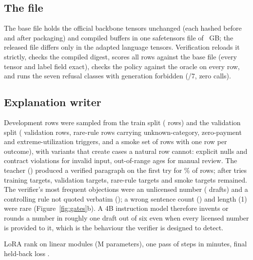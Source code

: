 \documentclass[twocolumn,10pt]{article}
\begin{document}
\subsection{The file}

The base file holds the \nOfficialTensors{} official backbone tensors unchanged (each hashed before and after packaging)
and \nCompiledTensors{} compiled buffers in one safetensors file of \nWeightGB{}~GB; the released file differs only in the
adapted language tensors. Verification reloads it strictly, checks the compiled digest, scores all \nParityRows{} rows
against the base file (every tensor and label field exact), checks the policy against the oracle on every row, and runs
the seven refusal classes with generation forbidden (\nRefusalClasses{}/7, zero calls).

\subsection{Explanation writer}

Development rows were sampled from the train split (\nRowsTrain{} rows) and the validation split (\nRowsValidation{}
validation rows, \nRowsRare{} rare-rule rows carrying unknown-category, zero-payment and extreme-utilization triggers,
and a smoke set of \nRowsSmoke{} rows with one row per outcome), with variants that create cases a natural row cannot:
explicit nulls and contract violations for invalid input, out-of-range ages for manual review. The teacher
(\nTeacher{}) produced a verified paragraph on the first try for \nFirstTryYield\% of rows; after \nTries{} tries
\nTargetsTrain{} training targets, \nTargetsValidation{} validation targets, \nTargetsRare{} rare-rule targets and
\nTargetsSmoke{} smoke targets remained. The verifier's most frequent objections were an unlicensed number
(\nRejectNumbers{} drafts) and a controlling rule not quoted verbatim (\nRejectRule{}); a wrong sentence count
(\nRejectSentences{}) and length (1) were rare (Figure~\ref{fig:gates}b). A 4B instruction model therefore invents
or rounds a number in roughly one draft out of six even when every licensed number is provided to it, which is the
behaviour the verifier is designed to detect.

LoRA rank \nLoraRank{} on \nLoraModules{} linear modules (\nLoraParams{}M parameters), one pass of \nLoraSteps{}
steps in \nLoraMinutes{} minutes, final held-back loss \nEvalLoss{}.
\end{document}
